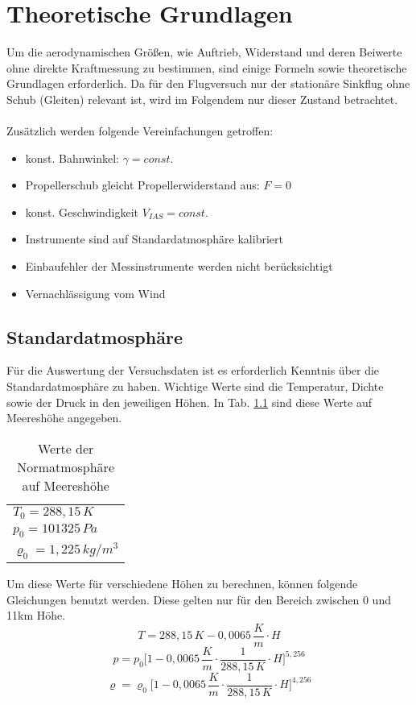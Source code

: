\chapter{Theoretische Grundlagen}
\label{chapter:theorie}
Um die aerodynamischen Größen, wie Auftrieb, Widerstand und deren Beiwerte ohne direkte Kraftmessung zu bestimmen, sind einige Formeln sowie theoretische Grundlagen erforderlich. Da für den Flugversuch nur der stationäre Sinkflug ohne Schub (Gleiten) relevant ist, wird im Folgendem nur dieser Zustand betrachtet. \\ \\
Zusätzlich werden folgende Vereinfachungen getroffen:
\begin{itemize}
	\item konst. Bahnwinkel: $\gamma = const.$ 
	\item Propellerschub gleicht Propellerwiderstand aus: $F=0$
	\item konst. Geschwindigkeit $V_{IAS} = const.$
	\item Instrumente sind auf Standardatmosphäre kalibriert
	\item Einbaufehler der Messinstrumente werden nicht berücksichtigt
	\item Vernachlässigung vom Wind
\end{itemize}

\vspace{1cm}
\section{Standardatmosphäre}
Für die Auswertung der Versuchsdaten ist es erforderlich Kenntnis über die Standardatmosphäre zu haben. Wichtige Werte sind die Temperatur, Dichte sowie der Druck in den jeweiligen Höhen. In Tab. \ref{tab:atm_0} sind diese Werte auf Meereshöhe angegeben.
\begin{table}[h]
	\centering
	\begin{tabular}{l}
		\hline
		$T_0=288,15\,K$ \\
		$p_0=101325\,Pa$ \\
		$\varrho_0 = 1,225\,kg/m^3$ \\
		\hline		
	\end{tabular}
	\caption{Werte der Normatmosphäre auf Meereshöhe} \label{tab:atm_0}
\end{table}
Um diese Werte für verschiedene Höhen zu berechnen, können folgende Gleichungen benutzt werden. Diese gelten nur für den Bereich zwischen 0 und 11km Höhe.
\begin{equation}\label{eq:T_INA}
T=288,15\,K - 0,0065\, \frac{K}{m} \cdot H
\end{equation}
\begin{equation}\label{eq:p_INA}
p=p_0\biggl[1-0,0065\, \frac{K}{m} \cdot \frac{1}{288,15\,K} \cdot H\biggr]^{5,256}
\end{equation}
\begin{equation}\label{eq:roh_INA}
\varrho = \varrho_0 \biggl[1-0,0065 \,\frac{K}{m} \cdot \frac{1}{288,15\,K} \cdot H\biggr]^{4,256}
\end{equation}
